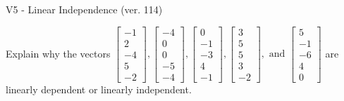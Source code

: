 \begin{exercise}
  \begin{exerciseTitle}V5 - Linear Independence (ver. 114)\end{exerciseTitle}
  \begin{exerciseStatement}
    Explain why the vectors \(\left[\begin{array}{r}
-1 \\
2 \\
-4 \\
5 \\
-2
\end{array}\right] , \left[\begin{array}{r}
-4 \\
0 \\
0 \\
-5 \\
-4
\end{array}\right] , \left[\begin{array}{r}
0 \\
-1 \\
-3 \\
4 \\
-1
\end{array}\right] , \left[\begin{array}{r}
3 \\
5 \\
5 \\
3 \\
-2
\end{array}\right] , \text{ and } \left[\begin{array}{r}
5 \\
-1 \\
-6 \\
4 \\
0
\end{array}\right]\) are linearly dependent or linearly independent.	



\end{exerciseStatement}
\end{exercise}
